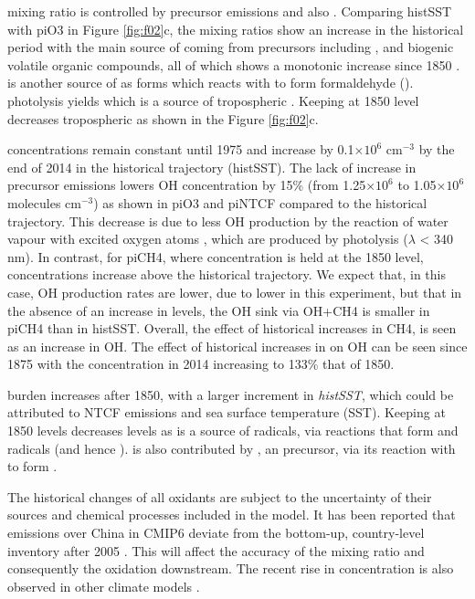  mixing ratio is controlled by  precursor emissions and also . Comparing histSST with piO3 in Figure \ref{fig:f02}c, the  mixing ratios show an increase in the historical period with the main source of  coming from  precursors including ,  and biogenic volatile organic compounds, all of which shows a monotonic increase since 1850 \citep{griffithsTroposphericOzoneCMIP62021}.  is another source of  as  forms  which reacts with  to form formaldehyde ().  photolysis yields  which is a source of tropospheric . Keeping  at 1850 level decreases tropospheric  as shown in the Figure \ref{fig:f02}c.


 concentrations remain constant until 1975 and increase by 0.1$\times 10^6$ cm$^{-3}$ by the end of 2014 in the historical trajectory (histSST). The lack of increase in  precursor emissions lowers OH concentration by 15\% (from 1.25$\times10^6$ to 1.05$\times10^6$ molecules cm$^{-3}$) as shown in piO3 and piNTCF compared to the historical trajectory. This decrease is due to less OH production by the reaction of water vapour with excited oxygen atoms , which are produced by  photolysis ($\lambda$ < 340 nm). In contrast, for piCH4, where  concentration is held at the 1850 level,  concentrations increase above the historical trajectory. We expect that, in this case,  OH production rates are lower, due to lower  in this experiment, but that in the absence of an increase in  levels, the OH sink via OH+CH4 is smaller in piCH4 than in histSST. Overall, the effect of historical increases in CH4, is seen as an increase in OH. The effect of historical increases in   on OH can be seen since 1875 with the  concentration in 2014 increasing to 133\% that of 1850. 


 burden increases after 1850, with a larger increment in \textit{histSST}, which could be attributed to NTCF emissions and sea surface temperature (SST). Keeping  at 1850 levels decreases  levels as  is a source of  radicals, via reactions that form  and  radicals (and hence ).  is also contributed by , an  precursor, via its reaction with  to form . 


The historical changes of all oxidants are subject to the uncertainty of their sources and chemical processes included in the model. It has been reported that  emissions over China in CMIP6 deviate from the bottom-up, country-level inventory after 2005 \citep{fanComparisonAnthropogenicEmission2022}. This will affect the accuracy of the  mixing ratio and consequently the oxidation downstream. The recent rise in  concentration is also observed in other climate models \citep{zhaoIntermodelComparisonGlobal2019}. 


